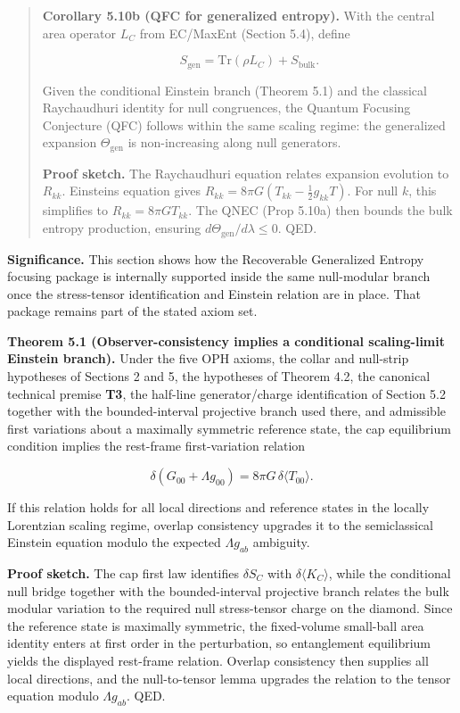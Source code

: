 \begin{quote}
\textbf{Corollary 5.10b (QFC for generalized entropy).} With the central area operator \(L_C\) from EC/MaxEnt (Section 5.4), define

\[
S_{\mathrm{gen}} = \mathrm{Tr}(\rho L_C) + S_{\mathrm{bulk}}.
\]

Given the conditional Einstein branch (Theorem 5.1) and the classical Raychaudhuri identity for null congruences, the Quantum Focusing Conjecture (QFC) follows within the same scaling regime: the generalized expansion \(\Theta_{\mathrm{gen}}\) is non-increasing along null generators.

\textbf{Proof sketch.} The Raychaudhuri equation relates expansion evolution to \(R_{kk}\). Einstein\textquotesingle s equation gives \(R_{kk} = 8\pi G (T_{kk} - \frac{1}{2}g_{kk}T)\). For null \(k\), this simplifies to \(R_{kk} = 8\pi G T_{kk}\). The QNEC (Prop 5.10a) then bounds the bulk entropy production, ensuring \(d\Theta_{\mathrm{gen}}/d\lambda \le 0\). QED.
\end{quote}

\textbf{Significance.} This section shows how the Recoverable Generalized Entropy focusing package is internally supported inside the same null-modular branch once the stress-tensor identification and Einstein relation are in place. That package remains part of the stated axiom set.

\textbf{Theorem 5.1 (Observer-consistency implies a conditional scaling-limit Einstein branch).} Under the five OPH axioms, the collar and null-strip hypotheses of Sections 2 and 5, the hypotheses of Theorem 4.2, the canonical technical premise \textbf{T3}, the half-line generator/charge identification of Section 5.2 together with the bounded-interval projective branch used there, and admissible first variations about a maximally symmetric reference state, the cap equilibrium condition implies the rest-frame first-variation relation

\[
\delta\!\left(G_{00}+\Lambda g_{00}\right)=8\pi G\,\delta\langle T_{00}\rangle.
\]

If this relation holds for all local directions and reference states in the locally Lorentzian scaling regime, overlap consistency upgrades it to the semiclassical Einstein equation modulo the expected \(\Lambda g_{ab}\) ambiguity.

\textbf{Proof sketch.} The cap first law identifies \(\delta S_C\) with \(\delta\langle K_C\rangle\), while the conditional null bridge together with the bounded-interval projective branch relates the bulk modular variation to the required null stress-tensor charge on the diamond. Since the reference state is maximally symmetric, the fixed-volume small-ball area identity enters at first order in the perturbation, so entanglement equilibrium yields the displayed rest-frame relation. Overlap consistency then supplies all local directions, and the null-to-tensor lemma upgrades the relation to the tensor equation modulo \(\Lambda g_{ab}\). QED.

